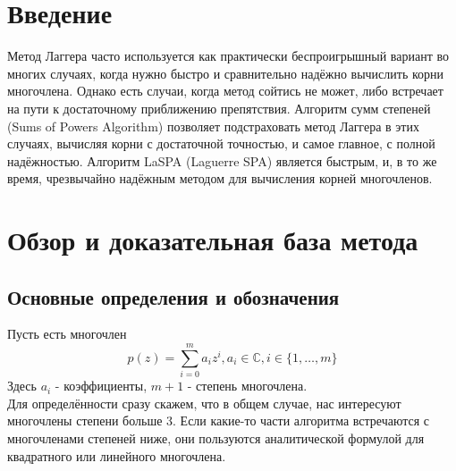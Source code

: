 \documentclass[a4paper,12pt]{article}
\begin{document}
\tableofcontents
\hyperpage{}

\newpage
\section{Введение} 
Метод Лаггера часто используется как практически беспроигрышный вариант во многих случаях, когда нужно быстро и сравнительно надёжно вычислить корни многочлена. Однако есть случаи, когда метод сойтись не может, либо встречает на пути к достаточному приближению препятствия. Алгоритм сумм степеней (Sums of Powers Algorithm) позволяет подстраховать метод Лаггера в этих случаях, вычисляя корни с достаточной точностью, и самое главное, с полной надёжностью. Алгоритм LaSPA (Laguerre SPA) является быстрым, и, в то же время, чрезвычайно надёжным методом для вычисления корней многочленов.
\newpage
\section{Обзор и доказательная база метода}
\subsection{Основные определения и обозначения}
Пусть есть многочлен 
\begin{equation}
    p(z)=\sum_{i=0}^m{a_iz^i}, a_i \in \mathbb{C}, i \in \{1,\dots,m\}
\end{equation}
Здесь $a_i$ - коэффициенты, $m+1$ - степень многочлена. \\
Для определённости сразу скажем, что в общем случае, нас интересуют многочлены степени больше 3. Если какие-то части алгоритма встречаются с многочленами степеней ниже, они пользуются аналитической формулой для квадратного или линейного многочлена. 
\end{document}
